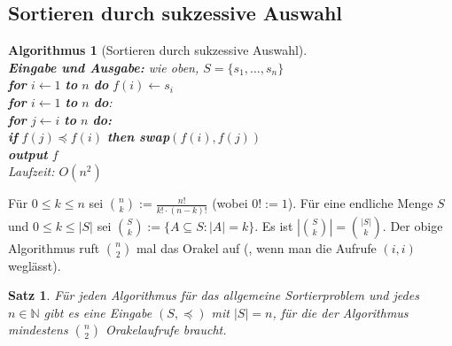 \documentclass[12pt,a4paper]{article}
\theoremstyle{plain}
\newtheorem{Satz}[Theorem]{Satz}
\newtheorem{Algorithmus}[Theorem]{Algorithmus}
\newcommand{\N}{\mathbb{N}}
\numberwithin{equation}{section}
\begin{document}
\subsection{Sortieren durch sukzessive Auswahl}
\begin{Algorithmus}[Sortieren durch sukzessive Auswahl]\\
\textbf{Eingabe und Ausgabe:} wie oben, $S=\{s_1,\ldots,s_n\}$\\
\textbf{for} $i\leftarrow 1$ \textbf{to} $n$ \textbf{do} $f(i)\leftarrow s_i$\\
\textbf{for} $i\leftarrow 1$ \textbf{to} $n$ \textbf{do}:\\
\text{\qquad} \textbf{for} $j \leftarrow i$ \textbf{to} $n$ \textbf{do:}\\
\text{\qquad \qquad} \textbf{if} $f(j)\preceq f(i)$ \textbf{then swap}$(f(i),f(j))$\\
\textbf{output} $f$  \\
Laufzeit: $O(n^2)$
\end{Algorithmus}
Für $0\leq k\leq n$ sei $\binom n k:=\frac{n!}{k!\cdot (n-k)!}$ (wobei $0!:=1$). Für eine endliche Menge $S$ und $0\leq k \leq |S|$ sei $\binom S k := \{A\subseteq S: |A|=k\}$. Es ist $\left|\binom S k \right| = \binom {|S|}{k}$. Der obige Algorithmus ruft $\binom n 2$ mal das Orakel auf (, wenn man die Aufrufe $(i,i)$ weglässt).
\begin{Satz}
Für jeden Algorithmus für das allgemeine Sortierproblem und jedes $n\in \N$ gibt es eine Eingabe $(S,\preceq)$ mit $|S|=n$, für die der Algorithmus mindestens $\binom n 2$ Orakelaufrufe braucht.
\end{Satz}
\end{document}
